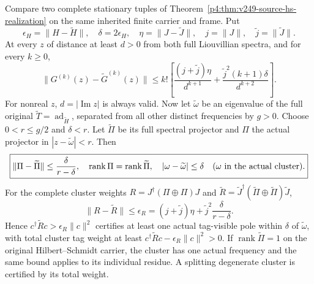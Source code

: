 \documentclass[12pt,a4paper]{article}
\begin{document}
\begin{theorem}
\label{p4:thm:v249-certified-visible-poles}
Compare two complete stationary tuples of
Theorem~\ref{p4:thm:v249-source-hs-realization} on the same inherited
finite carrier and frame. Put
\[
 \epsilon_H=\|H-\widetilde H\|,\quad
 \delta=2\epsilon_H,\quad
 \eta=\|J-\widetilde J\|,\quad
 j=\|J\|,\quad\widetilde j=\|\widetilde J\|.
\]
At every $z$ of distance at least $d>0$ from both full Liouvillian
spectra, and for every $k\ge0$,
\[
 \boxed{\|G^{(k)}(z)-\widetilde G^{(k)}(z)\|
 \le k!\left[
 \frac{(j+\widetilde j)\eta}{d^{k+1}}
 +\frac{\widetilde j^2(k+1)\delta}{d^{k+2}}
 \right].}
\]
For nonreal $z$, $d=|\operatorname{Im}z|$ is always valid.
Now let $\widetilde\omega$ be an eigenvalue of the full original
$\widetilde T=\operatorname{ad}_{\widetilde H}$, separated from all
other distinct frequencies by $g>0$. Choose $0<r\le g/2$ and
$\delta<r$. Let $\widetilde\Pi$ be its full spectral projector and
$\Pi$ the actual projector in $|z-\widetilde\omega|<r$. Then
\[
 \boxed{\|\Pi-\widetilde\Pi\|
 \le\frac{\delta}{r-\delta},\quad
 \operatorname{rank}\Pi=\operatorname{rank}\widetilde\Pi,\quad
 |\omega-\widetilde\omega|\le\delta
 \quad(\omega\hbox{ in the actual cluster}).}
\]
For the complete cluster weights
$R=J^\dagger(\Pi\oplus\Pi)J$ and
$\widetilde R=\widetilde J^\dagger
 (\widetilde\Pi\oplus\widetilde\Pi)\widetilde J$,
\[
 \boxed{\|R-\widetilde R\|\le\epsilon_R
 =(j+\widetilde j)\eta+
       \widetilde j^2\frac{\delta}{r-\delta}.}
\]
Hence $c^\dagger\widetilde R c>\epsilon_R\|c\|^2$
certifies at least one actual tag-visible pole within $\delta$ of
$\widetilde\omega$, with total cluster tag weight at least
$c^\dagger\widetilde R c-\epsilon_R\|c\|^2>0$.
If $\operatorname{rank}\widetilde\Pi=1$ on the original
Hilbert--Schmidt carrier, the cluster has one actual frequency and
the same bound applies to its individual residue. A splitting
degenerate cluster is certified by its total weight.
\end{theorem}
\end{document}
